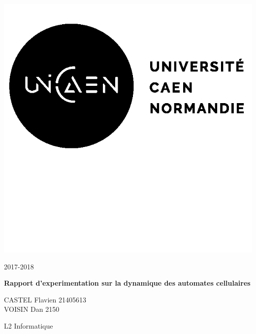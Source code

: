 \documentclass[12pt, a4paper]{article}
\begin{document}
    
    \begin{titlepage}
        \begin{minipage}{.4\linewidth}
            \includegraphics{img/logo.png}
        \end{minipage}
        \hfill
        \begin{minipage}{.4\linewidth}
            \begin{flushright}
                2017-2018
            \end{flushright}
        \end{minipage}
        
        \vspace{7cm}
        
        \begin{center}
            \textbf{\Huge{Rapport d'experimentation sur la dynamique des automates cellulaires}}
        \end{center}
        
        \vspace{9cm}
        
        \begin{minipage}{.4\linewidth}
            CASTEL Flavien 21405613\\
            VOISIN Dan 2150
        \end{minipage}
        \hfill
        \begin{minipage}{.4\linewidth}
            \begin{flushright}
                L2 Informatique
            \end{flushright}
        \end{minipage}
    
    \end{titlepage}
    
\end{document}
